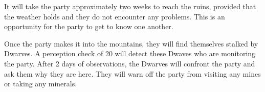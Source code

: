 It will take the party approximately two weeks to reach the ruins, provided that the weather holds and they do not encounter any problems.
This is an opportunity for the party to get to know one another.

Once the party makes it into the mountains, they will find themselves stalked by Dwarves.
A perception check of 20 will detect these Dwaves who are monitoring the party.
After 2 days of observations, the Dwarves will confront the party and ask them why they are here.
They will warn off the party from visiting any mines or taking any minerals.
